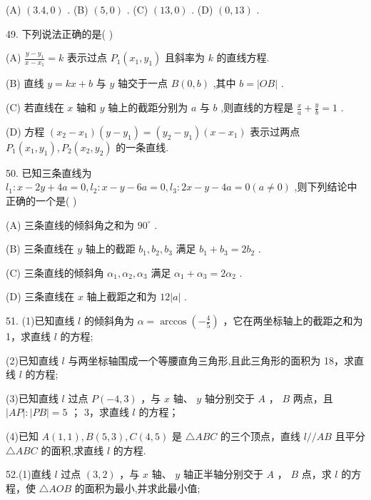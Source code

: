\documentclass[10pt]{article}
\begin{document}
(A) \(\left( {{3.4},0}\right)\) . (B) \(\left( {5,0}\right)\) . (C) \(\left( {{13},0}\right)\) . (D) \(\left( {0,{13}}\right)\) .

49. 下列说法正确的是( )

(A) \(\frac{y - {y}_{1}}{x - {x}_{1}} = k\) 表示过点 \({P}_{1}\left( {{x}_{1},{y}_{1}}\right)\) 且斜率为 \(k\) 的直线方程.

(B) 直线 \(y = {kx} + b\) 与 \(y\) 轴交于一点 \(B\left( {0,b}\right)\) ,其中 \(b = \left| {OB}\right|\) .

(C) 若直线在 \(x\) 轴和 \(y\) 轴上的截距分别为 \(a\) 与 \(b\) ,则直线的方程是 \(\frac{x}{a} + \frac{y}{b} = 1\) .

(D) 方程 \(\left( {{x}_{2} - {x}_{1}}\right) \left( {y - {y}_{1}}\right)  = \left( {{y}_{2} - {y}_{1}}\right) \left( {x - {x}_{1}}\right)\) 表示过两点 \({P}_{1}\left( {{x}_{1},{y}_{1}}\right) ,{P}_{2}\left( {{x}_{2},{y}_{2}}\right)\) 的一条直线.

50. 已知三条直线为 \({l}_{1} : x - {2y} + {4a} = 0,{l}_{2} : x - y - {6a} = 0,{l}_{3} : {2x} - y - {4a} = 0\left( {a \neq  0}\right)\) ,则下列结论中正确的一个是( )

(A) 三条直线的倾斜角之和为 \({90}^{ \circ  }\) .

(B) 三条直线在 \(y\) 轴上的截距 \({b}_{1},{b}_{2},{b}_{3}\) 满足 \({b}_{1} + {b}_{3} = 2{b}_{2}\) .

(C) 三条直线的倾斜角 \({\alpha }_{1},{\alpha }_{2},{\alpha }_{3}\) 满足 \({\alpha }_{1} + {\alpha }_{3} = 2{\alpha }_{2}\) .

(D) 三条直线在 \(x\) 轴上截距之和为 \({12}\left| a\right|\) .

51. (1)已知直线 \(l\) 的倾斜角为 \(\alpha  = \arccos \left( {-\frac{4}{5}}\right)\) ，它在两坐标轴上的截距之和为 1，求直线 \(l\) 的方程;

(2)已知直线 \(l\) 与两坐标轴围成一个等腰直角三角形,且此三角形的面积为 18，求直线 \(l\) 的方程;

(3)已知直线 \(l\) 过点 \(P\left( {-4,3}\right)\) ，与 \(x\) 轴、 \(y\) 轴分别交于 \(A\) ， \(B\) 两点，且 \(\left| {AP}\right|  : \left| {PB}\right|  = 5\) ； 3，求直线 \(l\) 的方程；

(4)已知 \(A\left( {1,1}\right) ,B\left( {5,3}\right) ,C\left( {4,5}\right)\) 是 \(\bigtriangleup  {ABC}\) 的三个顶点，直线 \(l//{AB}\) 且平分 \(\bigtriangleup  {ABC}\) 的面积,求直线 \(l\) 的方程.

52.(1)直线 \(l\) 过点 \(\left( {3,2}\right)\) ，与 \(x\) 轴、 \(y\) 轴正半轴分别交于 \(A\) ， \(B\) 点，求 \(l\) 的方程，使 \(\bigtriangleup  {AOB}\) 的面积为最小,并求此最小值;
\end{document}
